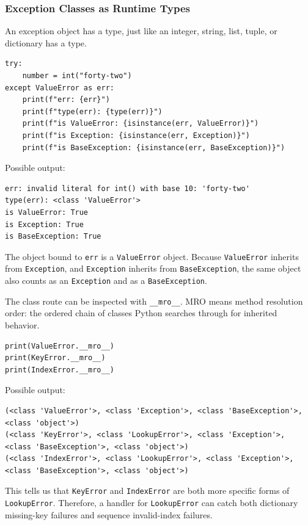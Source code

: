 \documentclass[a4paper,twoside]{report}
\begin{document}
\subsubsection{Exception Classes as Runtime Types}

An exception object has a type, just like an integer, string, list, tuple, or dictionary has a type.

\begin{verbatim}
try:
    number = int("forty-two")
except ValueError as err:
    print(f"err: {err}")
    print(f"type(err): {type(err)}")
    print(f"is ValueError: {isinstance(err, ValueError)}")
    print(f"is Exception: {isinstance(err, Exception)}")
    print(f"is BaseException: {isinstance(err, BaseException)}")
\end{verbatim}

Possible output:

\begin{verbatim}
err: invalid literal for int() with base 10: 'forty-two'
type(err): <class 'ValueError'>
is ValueError: True
is Exception: True
is BaseException: True
\end{verbatim}

The object bound to \texttt{err} is a \texttt{ValueError} object. Because \texttt{ValueError} inherits from \texttt{Exception}, and \texttt{Exception} inherits from \texttt{BaseException}, the same object also counts as an \texttt{Exception} and as a \texttt{BaseException}.

The class route can be inspected with \texttt{\_\_mro\_\_}. MRO means method resolution order: the ordered chain of classes Python searches through for inherited behavior.

\begin{verbatim}
print(ValueError.__mro__)
print(KeyError.__mro__)
print(IndexError.__mro__)
\end{verbatim}

Possible output:

\begin{verbatim}
(<class 'ValueError'>, <class 'Exception'>, <class 'BaseException'>, <class 'object'>)
(<class 'KeyError'>, <class 'LookupError'>, <class 'Exception'>, <class 'BaseException'>, <class 'object'>)
(<class 'IndexError'>, <class 'LookupError'>, <class 'Exception'>, <class 'BaseException'>, <class 'object'>)
\end{verbatim}

This tells us that \texttt{KeyError} and \texttt{IndexError} are both more specific forms of \texttt{LookupError}. Therefore, a handler for \texttt{LookupError} can catch both dictionary missing-key failures and sequence invalid-index failures.
\end{document}

